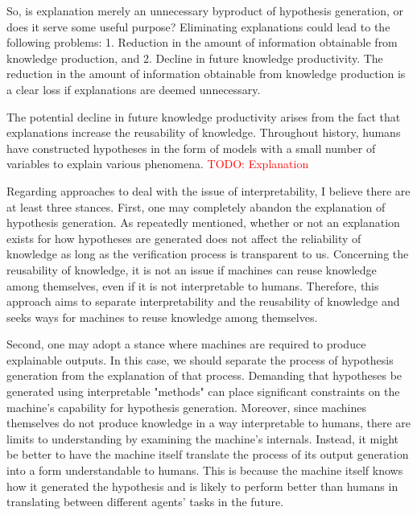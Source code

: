 \documentclass{book}
\begin{document}
So, is explanation merely an unnecessary byproduct of hypothesis generation, or does it serve some useful purpose? Eliminating explanations could lead to the following problems: 1. Reduction in the amount of information obtainable from knowledge production, and 2. Decline in future knowledge productivity. The reduction in the amount of information obtainable from knowledge production is a clear loss if explanations are deemed unnecessary.

The potential decline in future knowledge productivity arises from the fact that explanations increase the reusability of knowledge. Throughout history, humans have constructed hypotheses in the form of models with a small number of variables to explain various phenomena. 
\textcolor{red}{TODO: Explanation}

Regarding approaches to deal with the issue of interpretability, I believe there are at least three stances. First, one may completely abandon the explanation of hypothesis generation. As repeatedly mentioned, whether or not an explanation exists for how hypotheses are generated does not affect the reliability of knowledge as long as the verification process is transparent to us. Concerning the reusability of knowledge, it is not an issue if machines can reuse knowledge among themselves, even if it is not interpretable to humans. Therefore, this approach aims to separate interpretability and the reusability of knowledge and seeks ways for machines to reuse knowledge among themselves.

Second, one may adopt a stance where machines are required to produce explainable outputs. In this case, we should separate the process of hypothesis generation from the explanation of that process. Demanding that hypotheses be generated using interpretable "methods" can place significant constraints on the machine's capability for hypothesis generation. Moreover, since machines themselves do not produce knowledge in a way interpretable to humans, there are limits to understanding by examining the machine's internals. Instead, it might be better to have the machine itself translate the process of its output generation into a form understandable to humans. This is because the machine itself knows how it generated the hypothesis and is likely to perform better than humans in translating between different agents' tasks in the future.
\end{document}

